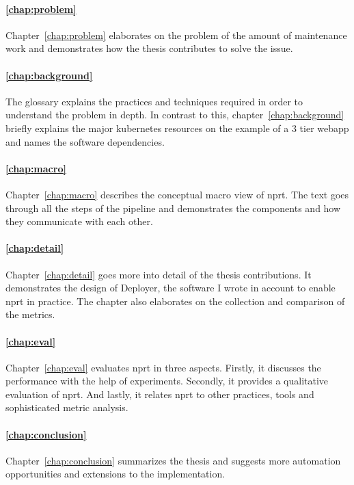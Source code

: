 \paragraph{\ref{chap:problem} }
Chapter~\ref{chap:problem} elaborates on the problem of the amount of maintenance work and
demonstrates how the thesis contributes to solve the issue.

\paragraph{\ref{chap:background} }
The glossary explains the practices and techniques required in order to understand the
problem in depth. In contrast to this, chapter~\ref{chap:background} briefly explains the
major kubernetes resources on the example of a 3 tier webapp and names the software
dependencies.

\paragraph{\ref{chap:macro} }
Chapter~\ref{chap:macro} describes the conceptual macro view of \gls{nprt}. The text goes
through all the steps of the pipeline and demonstrates the components and how they
communicate with each other.

\paragraph{\ref{chap:detail} }
Chapter~\ref{chap:detail} goes more into detail of the thesis contributions. It
demonstrates the design of Deployer, the software I wrote in account to enable \gls{nprt}
in practice. The chapter also elaborates on the collection and comparison of the metrics.

\paragraph{\ref{chap:eval} }
Chapter~\ref{chap:eval} evaluates \gls{nprt} in three aspects. Firstly, it discusses the
performance with the help of experiments. Secondly, it provides a qualitative evaluation
of \gls{nprt}. And lastly, it relates \gls{nprt} to other practices, tools and
sophisticated metric analysis.

\paragraph{\ref{chap:conclusion} }
Chapter~\ref{chap:conclusion} summarizes the thesis and suggests more automation
opportunities and extensions to the implementation.

